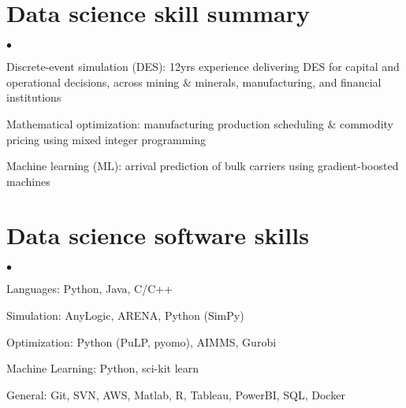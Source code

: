 \documentclass[margin,line]{resume}
\newenvironment{list2}{
  \begin{list}{$\bullet$}{%
      \setlength{\itemsep}{0in}
      \setlength{\parsep}{0in} \setlength{\parskip}{0in}
      \setlength{\topsep}{0in} \setlength{\partopsep}{0in}
      \setlength{\leftmargin}{0.2in}}}{\end{list}}
\begin{document}
\begin{resume}
\section{\sc Data science skill summary}
\begin{list2}
\item Discrete-event simulation (DES): 12yrs experience delivering DES for capital and operational decisions, across mining \& minerals, manufacturing, and financial institutions
\item Mathematical optimization: manufacturing production scheduling \& commodity pricing using mixed integer programming
\item Machine learning (ML): arrival prediction of bulk carriers using gradient-boosted machines
\end{list2}

\section{\sc Data science software skills}
\begin{list2}
\item Languages: Python, Java, C/C++
\item Simulation: AnyLogic, ARENA, Python (SimPy)
\item Optimization: Python (PuLP, pyomo), AIMMS, Gurobi
\item Machine Learning: Python, sci-kit learn
\item General: Git, SVN, AWS, Matlab, R, Tableau, PowerBI, SQL, Docker
\end{list2}


\end{resume}
\end{document}
